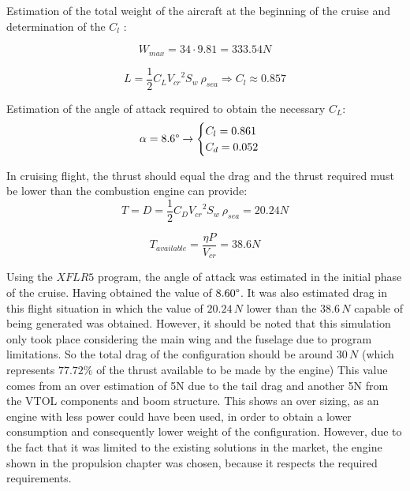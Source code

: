 \documentclass[english,fira]{ist-report}
\begin{document}
Estimation of the total weight of the aircraft at the beginning of the cruise and determination of the $C_l$ :

\begin{equation}
    W_{max} = 34 \cdot 9.81 = 333.54 N
\end{equation}

\begin{equation}
    L = \frac{1}{2} C_{L} {V_{cr}}^2 S_{w}\ \rho_{sea}\Longrightarrow C_{l}\approx0.857
\end{equation}

Estimation of the angle of attack required to obtain the necessary $C_L$:
\begin{equation}
    \alpha = 8.6 \degree \rightarrow \begin{cases} C_{l} = 0.861 \\ C_{d} = 0.052 \end{cases}
\end{equation}

In cruising flight, the thrust should equal the drag and the thrust required must be lower than the combustion engine can provide:
\begin{equation}
    T = D = \frac{1}{2} C_{D} {V_{cr}}^2 S_{w}\ \rho_{sea} = 20.24 N 
\end{equation}

\begin{equation}
    T_{available} = \frac{\eta P}{V_{cr}} = 38.6N
\end{equation}

Using the $XFLR5$\textregistered{}  program, the angle of attack was estimated in the initial phase of the cruise. Having obtained the value of $8.60\degree$. It was also estimated drag in this flight situation in which the value of $20.24\,N$ lower than the $38.6\,N$ capable of being generated was obtained. However, it should be noted that this simulation only took place considering the main wing and the fuselage due to program limitations. So the total drag of the configuration should be around $30\,N$ (which represents $77.72 \%$ of the thrust available to be made by the engine) This value comes from an over estimation of 5N due to the tail drag and another 5N from the VTOL components and boom structure. This shows an over sizing, as an engine with less power could have been used, in order to obtain a lower consumption and consequently lower weight of the configuration. However, due to the fact that it was limited to the existing solutions in the market, the engine shown in the propulsion chapter was chosen, because it respects the required requirements.
\end{document}
